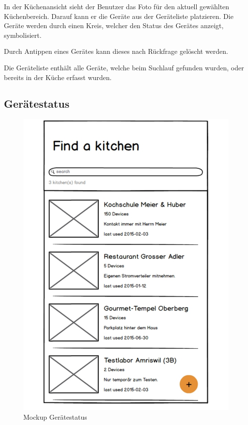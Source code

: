 In der Küchenansicht sieht der Benutzer das Foto für den aktuell gewählten Küchenbereich. Darauf kann er die Geräte aus der Geräteliste platzieren. Die Geräte werden durch einen Kreis, welcher den Status des Gerätes anzeigt, symbolisiert.

Durch Antippen eines Gerätes kann dieses nach Rückfrage gelöscht werden.

Die Geräteliste enthält alle Geräte, welche beim Suchlauf gefunden wurden, oder bereits in der Küche erfasst wurden.

\WFclear

\subsection{Gerätestatus}
\label{subsec:Gerätestatus}

\begin{figure}
	\begin{center}
		\includegraphics[page=5,trim=0 0 0 0,clip,scale=0.21]{uiux/res/mockups}
		\caption{Mockup Gerätestatus}
		\label{abb:mockDeviceDetail}
	\end{center}
\end{figure}

